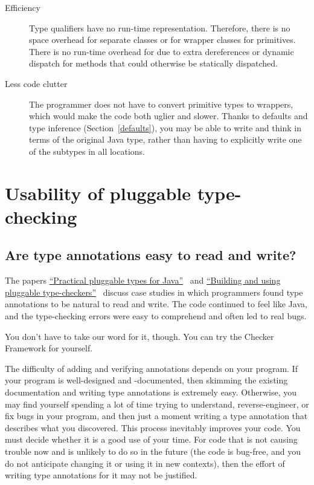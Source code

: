 \begin{description}
\item[Efficiency]
  Type qualifiers have no run-time representation.  Therefore, there is no
  space overhead for separate classes or for wrapper classes for
  primitives.  There is no run-time overhead for due to extra dereferences
  or dynamic dispatch for methods that could otherwise be statically
  dispatched.

\item[Less code clutter]
  The programmer does not have to convert primitive types to wrappers,
  which would make the code both uglier and slower.  Thanks to defaults and
  type inference (Section~\ref{defaults}),
  you may be able to write and think in terms of the
  original Java type, rather than having to explicitly write one of the
  subtypes in all locations.

\end{description}


\section{Usability of pluggable type-checking\label{faq-usability-section}}

\subsection{Are type annotations easy to read and write?\label{faq-ease-of-use}}


The papers
\href{http://homes.cs.washington.edu/~mernst/pubs/pluggable-checkers-issta2008-abstract.html}{``Practical
  pluggable types for Java''}~\cite{PapiACPE2008}
and
\href{http://homes.cs.washington.edu/~mernst/pubs/pluggable-checkers-icse2011-abstract.html}{``Building
  and using pluggable type-checkers''}~\cite{DietlDEMS2011}
discuss case studies in
which programmers
found type annotations to be natural to read and write.  The code
continued to feel like Java, and the type-checking errors were easy to
comprehend and often led to real bugs.

You don't have to take our word for it, though.  You can try the
Checker Framework for yourself.

The difficulty of adding and verifying annotations depends on your program.
If your program is well-designed and -documented, then skimming the
existing documentation and writing type annotations is extremely easy.
Otherwise, you may find yourself spending a lot of time trying to
understand, reverse-engineer, or fix bugs in your program, and then just a
moment writing a type annotation that describes what you discovered.  This
process inevitably improves your code.  You must decide whether it is a
good use of your time.  For code that is not causing trouble now and is
unlikely to do so in the future (the code is bug-free, and you do not
anticipate changing it or using it in new contexts), then the
effort of writing type annotations for it may not be justified.


